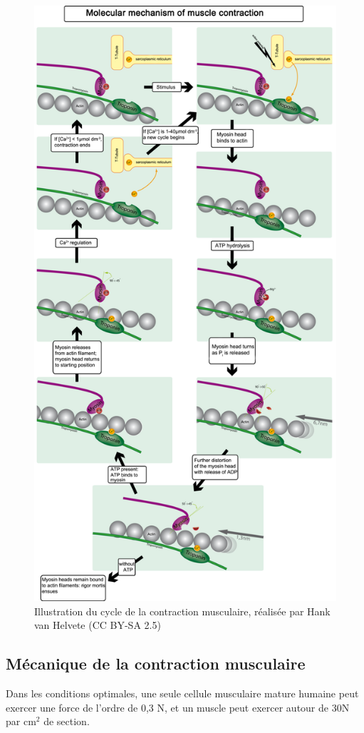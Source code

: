 \begin{figure}[p]
\includegraphics[scale=0.25]{Figures/Contraction.png}
\caption{Illustration du cycle de la contraction musculaire, réalisée par Hank van Helvete (CC BY-SA 2.5)}
\end{figure}
\subsection{Mécanique de la contraction musculaire}
Dans les conditions optimales, une seule cellule musculaire mature humaine peut exercer une force de l'ordre de 0,3 \micro N, et un muscle peut exercer autour de 30N par cm$^2$ de section. 


